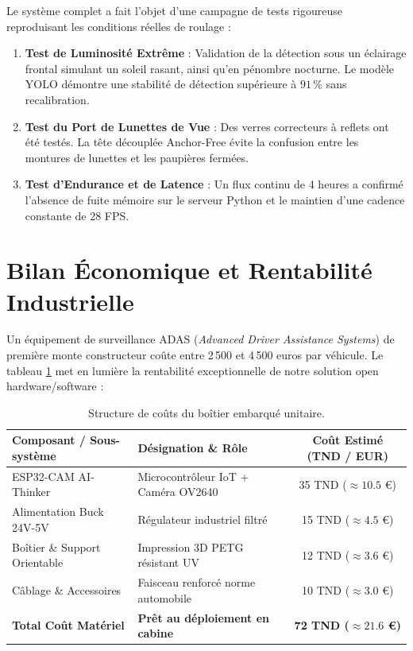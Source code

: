 \documentclass[11pt,a4paper]{article}
\begin{document}
Le système complet a fait l'objet d'une campagne de tests rigoureuse reproduisant les conditions réelles de roulage :
\begin{enumerate}
    \item \textbf{Test de Luminosité Extrême} : Validation de la détection sous un éclairage frontal simulant un soleil rasant, ainsi qu'en pénombre nocturne. Le modèle YOLO démontre une stabilité de détection supérieure à $91\,\%$ sans recalibration.
    \item \textbf{Test du Port de Lunettes de Vue} : Des verres correcteurs à reflets ont été testés. La tête découplée Anchor-Free évite la confusion entre les montures de lunettes et les paupières fermées.
    \item \textbf{Test d'Endurance et de Latence} : Un flux continu de 4 heures a confirmé l'absence de fuite mémoire sur le serveur Python et le maintien d'une cadence constante de 28 FPS.
\end{enumerate}

\section{Bilan Économique et Rentabilité Industrielle}

Un équipement de surveillance ADAS (\emph{Advanced Driver Assistance Systems}) de première monte constructeur coûte entre 2\,500 et 4\,500 euros par véhicule. Le tableau \ref{tab:cost_analysis} met en lumière la rentabilité exceptionnelle de notre solution open hardware/software :

\begin{table}[H]
\centering
\small
\begin{tabularx}{\textwidth}{l X c}
\toprule
\textbf{Composant / Sous-système} & \textbf{Désignation \& Rôle} & \textbf{Coût Estimé (TND / EUR)} \\
\midrule
ESP32-CAM AI-Thinker & Microcontrôleur IoT + Caméra OV2640 & 35 TND ($\approx 10.5$ €) \\
Alimentation Buck 24V-5V & Régulateur industriel filtré & 15 TND ($\approx 4.5$ €) \\
Boîtier \& Support Orientable & Impression 3D PETG résistant UV & 12 TND ($\approx 3.6$ €) \\
Câblage \& Accessoires & Faisceau renforcé norme automobile & 10 TND ($\approx 3.0$ €) \\
\midrule
\textbf{Total Coût Matériel} & \textbf{Prêt au déploiement en cabine} & \textbf{72 TND ($\approx 21.6$ €)} \\
\bottomrule
\end{tabularx}
\caption{Structure de coûts du boîtier embarqué unitaire.}
\label{tab:cost_analysis}
\end{table}
\end{document}
